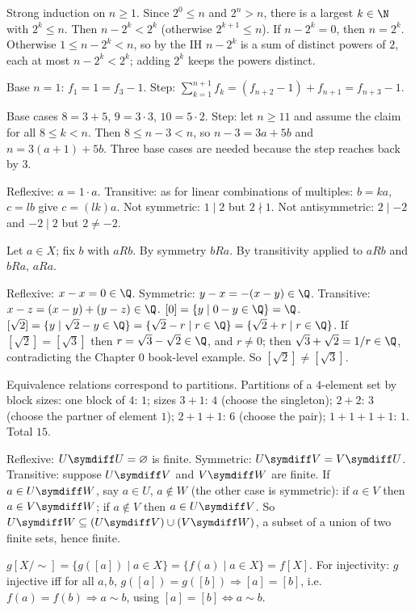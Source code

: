  Strong induction on $n\ge1$. Since $2^0\le n$ and $2^n>n$, there is a largest $k\in\N$ with $2^k\le n$. Then $n-2^k<2^k$ (otherwise $2^{k+1}\le n$). If $n-2^k=0$, then $n=2^k$. Otherwise $1\le n-2^k<n$, so by the IH $n-2^k$ is a sum of distinct powers of $2$, each at most $n-2^k<2^k$; adding $2^k$ keeps the powers distinct.

 Base $n=1$: $f_1=1=f_3-1$. Step: $\sum_{k=1}^{n+1}f_k=(f_{n+2}-1)+f_{n+1}=f_{n+3}-1$.

 Base cases $8=3+5$, $9=3\cdot3$, $10=5\cdot2$. Step: let $n\ge11$ and assume the claim for all $8\le k<n$. Then $8\le n-3<n$, so $n-3=3a+5b$ and $n=3(a+1)+5b$. Three base cases are needed because the step reaches back by $3$.

 Reflexive: $a=1\cdot a$. Transitive: as for linear combinations of multiples: $b=ka$, $c=lb$ give $c=(lk)a$. Not symmetric: $1\mid2$ but $2\nmid1$. Not antisymmetric: $2\mid-2$ and $-2\mid2$ but $2\ne-2$.

 Let $a\in X$; fix $b$ with $aRb$. By symmetry $bRa$. By transitivity applied to $aRb$ and $bRa$, $aRa$.

 Reflexive: $x-x=0\in\Q$. Symmetric: $y-x=-(x-y)\in\Q$. Transitive: $x-z=(x-y)+(y-z)\in\Q$. $[0]=\{y\mid 0-y\in\Q\}=\Q$. $[\sqrt2]=\{y\mid\sqrt2-y\in\Q\}=\{\sqrt2-r\mid r\in\Q\}=\{\sqrt2+r\mid r\in\Q\}$. If $[\sqrt2]=[\sqrt3]$ then $r=\sqrt3-\sqrt2\in\Q$, and $r\ne0$; then $\sqrt3+\sqrt2=1/r\in\Q$, contradicting the Chapter 0 book-level example. So $[\sqrt2]\ne[\sqrt3]$.

 Equivalence relations correspond to partitions. Partitions of a $4$-element set by block sizes: one block of $4$: $1$; sizes $3+1$: $4$ (choose the singleton); $2+2$: $3$ (choose the partner of element $1$); $2+1+1$: $6$ (choose the pair); $1+1+1+1$: $1$. Total $15$.

 Reflexive: $U\symdiff U=\varnothing$ is finite. Symmetric: $U\symdiff V=V\symdiff U$. Transitive: suppose $U\symdiff V$ and $V\symdiff W$ are finite. If $a\in U\symdiff W$, say $a\in U$, $a\notin W$ (the other case is symmetric): if $a\in V$ then $a\in V\symdiff W$; if $a\notin V$ then $a\in U\symdiff V$. So $U\symdiff W\subseteq(U\symdiff V)\cup(V\symdiff W)$, a subset of a union of two finite sets, hence finite.

 $g[X/{\sim}]=\{g([a])\mid a\in X\}=\{f(a)\mid a\in X\}=f[X]$. For injectivity: $g$ injective iff for all $a,b$, $g([a])=g([b])\Rightarrow[a]=[b]$, i.e.\ $f(a)=f(b)\Rightarrow a\sim b$, using $[a]=[b]\Leftrightarrow a\sim b$.

